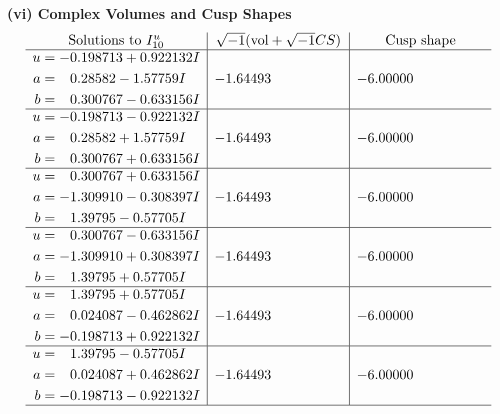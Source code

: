\documentclass[1p]{elsarticle_modified}
\theoremstyle{definition}
\newcommand{\I}{\sqrt{-1}}
\begin{document}
\newpage\flushleft \textbf{(vi) Complex Volumes and Cusp Shapes}
$$\begin{array}{c|c|c}  
\text{Solutions to }I^u_{10}& \I (\text{vol} + \sqrt{-1}CS) & \text{Cusp shape}\\
 \hline 
\begin{aligned}
u &= -0.198713 + 0.922132 I \\
a &= \phantom{-}0.28582 - 1.57759 I \\
b &= \phantom{-}0.300767 - 0.633156 I\end{aligned}
 & -1.64493\phantom{ +0.000000I} & -6.00000\phantom{ +0.000000I} \\ \hline\begin{aligned}
u &= -0.198713 - 0.922132 I \\
a &= \phantom{-}0.28582 + 1.57759 I \\
b &= \phantom{-}0.300767 + 0.633156 I\end{aligned}
 & -1.64493\phantom{ +0.000000I} & -6.00000\phantom{ +0.000000I} \\ \hline\begin{aligned}
u &= \phantom{-}0.300767 + 0.633156 I \\
a &= -1.309910 - 0.308397 I \\
b &= \phantom{-}1.39795 - 0.57705 I\end{aligned}
 & -1.64493\phantom{ +0.000000I} & -6.00000\phantom{ +0.000000I} \\ \hline\begin{aligned}
u &= \phantom{-}0.300767 - 0.633156 I \\
a &= -1.309910 + 0.308397 I \\
b &= \phantom{-}1.39795 + 0.57705 I\end{aligned}
 & -1.64493\phantom{ +0.000000I} & -6.00000\phantom{ +0.000000I} \\ \hline\begin{aligned}
u &= \phantom{-}1.39795 + 0.57705 I \\
a &= \phantom{-}0.024087 - 0.462862 I \\
b &= -0.198713 + 0.922132 I\end{aligned}
 & -1.64493\phantom{ +0.000000I} & -6.00000\phantom{ +0.000000I} \\ \hline\begin{aligned}
u &= \phantom{-}1.39795 - 0.57705 I \\
a &= \phantom{-}0.024087 + 0.462862 I \\
b &= -0.198713 - 0.922132 I\end{aligned}
 & -1.64493\phantom{ +0.000000I} & -6.00000\phantom{ +0.000000I}\\
 \hline 
 \end{array}$$\newpage\newpage\renewcommand{\arraystretch}{1}
\end{document}
